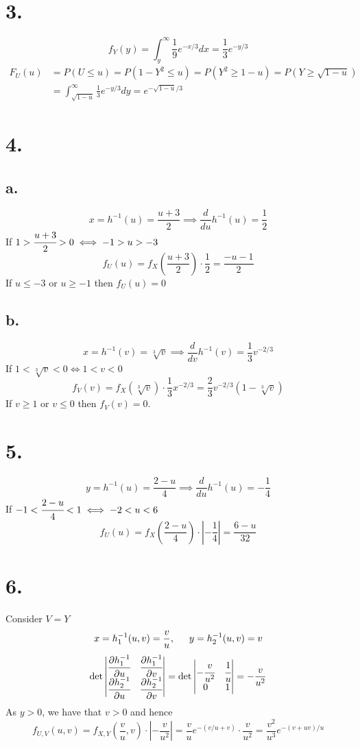 \documentclass[11pt]{article}
\begin{document}
\section*{3.}
\[
    f_Y(y) = \int_y^\infty \frac{1}{9}e^{-x/3} dx = \frac{1}{3}e^{-y/3}    
\]
\begin{equation*}
    \begin{aligned}
        F_U(u) &= P(U\le u) = P(1-Y^2 \le u) = P(Y^2 \ge 1-u) = P(Y\ge \sqrt{1-u}) \\
        &= \int_{\sqrt{1-u}}^\infty \frac{1}{3}e^{-y/3} dy  = e^{-\sqrt{1-u}/3} 
    \end{aligned}
\end{equation*}
\pagebreak
\section*{4.}
\subsection*{a.}
\[
    x = h^{-1}(u) = \frac{u+3}{2} \implies \frac{d}{du}h^{-1}(u) = \frac{1}{2}
\]
If $1>\cfrac{u+3}{2} > 0 \iff -1>u>-3$
\[
    f_U(u) = f_X\left(\frac{u+3}{2}\right) \cdot \frac{1}{2} = \frac{-u-1}{2}  
\]
If $u\le -3$ or $u \ge -1$ then $f_U(u) = 0$
\subsection*{b.}
\[
    x = h^{-1}(v) = \sqrt[3]{v} \implies \frac{d}{dv}h^{-1}(v) = \frac{1}{3} v^{-2/3}     
\]
If $1<\sqrt[3]{v}<0 \iff 1<v<0$
\[
    f_V(v) = f_X(\sqrt[3]{v}) \cdot \frac{1}{3}x^{-2/3} = \frac{2}{3}v^{-2/3}(1-\sqrt[3]{v}) 
\]
If $v\ge 1$ or $v \le 0$ then $f_V(v) = 0$.
\pagebreak
\section*{5.}
\[
    y = h^{-1}(u) = \frac{2-u}{4} \implies \frac{d}{du}h^{-1}(u) = -\frac{1}{4}    
\]
If $-1<\cfrac{2-u}{4}< 1 \iff -2<u<6$
\[
    f_U(u) = f_X\left(\frac{2-u}{4}\right) \cdot \left|-\frac{1}{4}\right| = \frac{6-u}{32} 
\]
\pagebreak
\section*{6.}
Consider $V=Y$
\[
    x = h_1^{-1}(u,v) = \frac{v}{u}, \indent  y = h_2^{-1}(u,v) = v
\]
\[
    \det 
    \begin{vmatrix}
        \cfrac{\partial h_1^{-1}}{\partial u} & \cfrac{\partial h_1^{-1}}{\partial v} \\
        \cfrac{\partial h_2^{-1}}{\partial u} & \cfrac{\partial h_2^{-1}}{\partial v}
    \end{vmatrix}    
    = 
    \det 
    \begin{vmatrix}
        -\cfrac{v}{u^2} & \cfrac{1}{u} \\
        0 & 1 
    \end{vmatrix}
    = -\frac{v}{u^2}
\]
As $y>0$, we have that $v>0$ and hence 
\[
    f_{U,V}(u,v) = f_{X,Y}\left(\frac{v}{u}, v\right) \cdot \left| -\frac{v}{u^2} \right| =  
    \frac{v}{u} e^{-(v/u + v)} \cdot \frac{v}{u^2} = \frac{v^2}{u^3}e^{-(v+uv)/u} 
\]
\pagebreak
\end{document}
